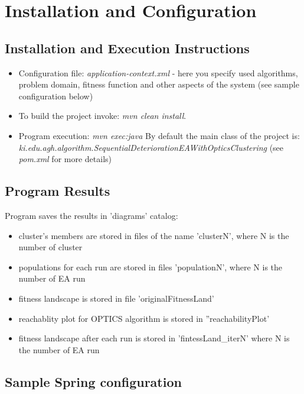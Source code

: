 \chapter{Installation and Configuration}
\label{Installation and Configuration}

\section{Installation and Execution Instructions}

\begin{itemize}
  \item Configuration file: \textit{application-context.xml} - here you specify
  used algorithms, problem domain, fitness function and other aspects
  of the system (see sample configuration below)
  \item To build the project invoke: \textit{mvn clean install}. 
  \item Program execution: \textit{mvn exec:java} By default the main class of
  the project is:
  \textit{ki.edu.agh.algorithm.SequentialDeteriorationEAWithOpticsClustering}
  (see \textit{pom.xml} for more details)
\end{itemize}

\section{Program Results}
Program saves the results in 'diagrams' catalog:
\begin{itemize}
 \item cluster's members are stored in files of the name 'clusterN', where N is
 the number of cluster 
 \item populations for each run are stored in files
 'populationN', where N is the number of EA run 
 \item fitness landscape is stored in file 'originalFitnessLand'
 \item reachablity plot for OPTICS algorithm is stored in ''reachabilityPlot'
 \item fitness landscape after each run is stored in 'fintessLand\_iterN' where
 N is the number of EA run
\end{itemize}


\section{Sample Spring configuration}
